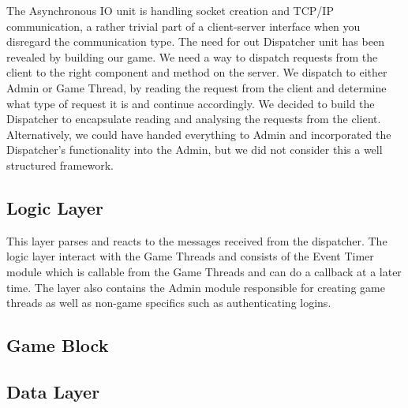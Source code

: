 The Asynchronous IO unit is handling socket creation and TCP/IP communication, a rather trivial part of a client-server interface when you disregard the communication type. The need for out Dispatcher unit has been revealed by building our game. We need a way to dispatch requests from the client to the right component and method on the server. We dispatch to either Admin or Game Thread, by reading the request from the client and determine what type of request it is and continue accordingly. We decided to build the Dispatcher to encapsulate reading and analysing the requests from the client. Alternatively, we could have handed everything to Admin and incorporated the Dispatcher's functionality into the Admin, but we did not consider this a well structured framework.





\subsection{Logic Layer}
This layer parses and reacts to the messages received from the dispatcher. The logic layer interact with the Game Threads and consists of the Event Timer module which is callable from the Game Threads and can do a callback at a later time. The layer also contains the Admin module responsible for creating game threads as well as non-game specifics such as authenticating logins.






\subsection{Game Block}



\subsection{Data Layer}


